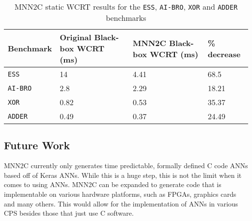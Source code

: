 \begin{table}[h]
	\centering
	\caption{MNN2C static \ac{WCRT} results for the \texttt{ESS}, \texttt{AI-BRO}, \texttt{XOR} and \texttt{ADDER} benchmarks}
	\label{tbl:res-mnn2c}
	\begin{tabular}{|p{}|p{}|p{}|p{}|}
		\hline
		Benchmark         & Original Black-box WCRT (ms) & MNN2C Black-box WCRT (ms)  &  \% \textbf{decrease} \\ \hline
		\texttt{ESS}        & 14 & 4.41 & 68.5 \\  \hline
		\texttt{AI-BRO}        & 2.8 & 2.29 & 18.21 \\ \hline
		\texttt{XOR}        & 0.82 & 0.53 & 35.37 \\  \hline
		\texttt{ADDER}        & 0.49 & 0.37 & 24.49 \\ \hline
	\end{tabular}
\end{table}

\subsection{Future Work}
\ac{MNN2C} currently only generates time predictable, formally defined C code \acp{ANN} based off of Keras \acp{ANN}.
While this is a huge step, this is not the limit when it comes to using \acp{ANN}.
\ac{MNN2C} can be expanded to generate code that is implementable on various hardware platforms, such as \acp{FPGA}, graphics cards and many others.
This would allow for the implementation of \acp{ANN} in various \ac{CPS} besides those that just use C software.







